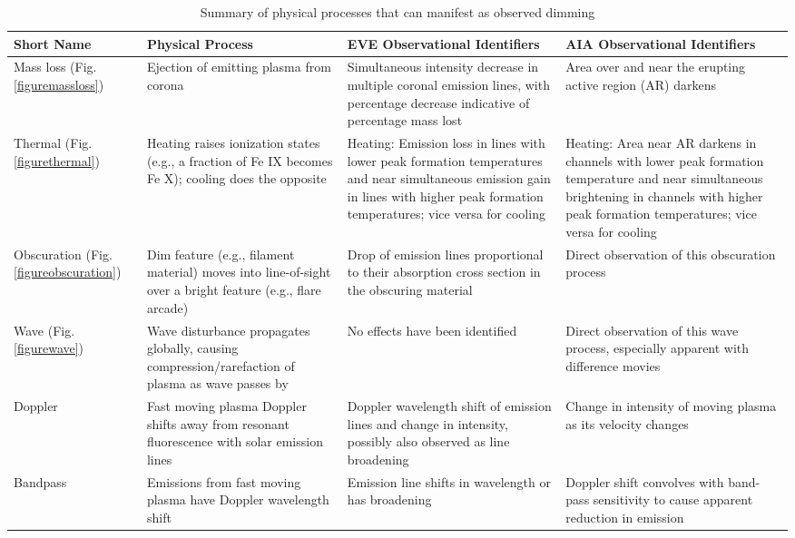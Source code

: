 \begin{table}[!htb]
    \caption{Summary of physical processes that can manifest as observed dimming}
    \begin{center}
    \begin{tabular}{|p{2.5cm}|p{4cm}|p{4cm}|p{4cm}|} \hline
	Short Name & Physical Process & EVE Observational Identifiers & AIA Observational Identifiers \\ \hline \hline
	Mass loss (Fig. \ref{figuremassloss}) & Ejection of emitting plasma from corona & Simultaneous intensity decrease in multiple coronal emission lines, with percentage decrease indicative of percentage mass lost & Area over and near the erupting active region (AR) darkens \\ \hline
	
	Thermal (Fig. \ref{figurethermal}) & Heating raises ionization states (e.g., a fraction of Fe IX becomes Fe X); cooling does the opposite & Heating: Emission loss in lines with lower peak formation temperatures and near simultaneous emission gain in lines with higher peak formation temperatures; vice versa for cooling & Heating: Area near AR darkens in channels with lower peak formation temperature and near simultaneous brightening in channels with higher peak formation temperatures; vice versa for cooling \\ \hline
	
	Obscuration (Fig. \ref{figureobscuration}) & Dim feature (e.g., filament material) moves into line-of-sight over a bright feature (e.g., flare arcade) & Drop of emission lines proportional to their absorption cross section in the obscuring material & Direct observation of this obscuration process \\ \hline
	
	Wave (Fig. \ref{figurewave}) & Wave disturbance propagates globally, causing compression/rarefaction of plasma as wave passes by & No effects have been identified & Direct observation of this wave process, especially apparent with difference movies \\ \hline
	
	Doppler & Fast moving plasma Doppler shifts away from resonant fluorescence with solar emission lines & Doppler wavelength shift of emission lines and change in intensity, possibly also observed as line broadening & Change in intensity of moving plasma as its velocity changes \\ \hline
	
	Bandpass & Emissions from fast moving plasma have Doppler wavelength shift & Emission line shifts in wavelength or has broadening & Doppler shift convolves with band-pass sensitivity to cause apparent reduction in emission \\ \hline
	
	\end{tabular}
    \\ \rule{0mm}{5mm}
\end{center}
\label{tablesummary}
\end{table}

